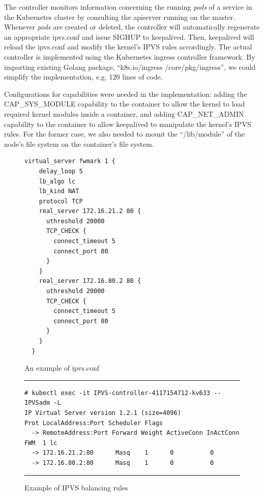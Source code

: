The controller monitors information concerning the running {\em pods} of a service 
in the Kubernetes cluster by consulting the apiserver running on the master.
Whenever {\em pods} are created or deleted, the controller will automatically regenerate an appropriate ipvs.conf 
and issue SIGHUP to keepalived.
Then, keepalived will reload the ipvs.conf and modify the kernel's IPVS rules accordingly.
The actual controller\cite{ktaka_ccmp_2017_826894} is implemented using the Kubernetes ingress controller\cite{K8sIngress2017} framework. 
By importing existing Golang package, \enquote{k8s.io/ingress /core/pkg/ingress}, we could simplify the implementation, e.g. 
120 lines of code.  


Configurations for capabilities were needed in the implementation: adding the CAP\_SYS\_MODULE capability 
to the container to allow the kernel to load required kernel modules inside a container, 
and adding CAP\_NET\_ADMIN capability to the container to allow keepalived to manipulate the kernel's IPVS rules. 
For the former case, we also needed to mount the \enquote{/lib/module} of the node's file system on the container's file system.

\begin{figure}
  \centering
\begin{minipage}{0.7\columnwidth}
\begin{lstlisting}[frame=single]
  virtual_server fwmark 1 {
    delay_loop 5
    lb_algo lc
    lb_kind NAT
    protocol TCP
    real_server 172.16.21.2 80 {
      uthreshold 20000
      TCP_CHECK {
        connect_timeout 5
        connect_port 80
      }
    }
    real_server 172.16.80.2 80 {
      uthreshold 20000
      TCP_CHECK {
        connect_timeout 5
        connect_port 80
      }
    }
  }
\end{lstlisting}
\end{minipage}
\caption{An example of ipvs.conf}
\label{fig:ipvs.conf}
\end{figure}

\begin{figure}
  \centering
\rule{\columnwidth}{0.4pt}
\begin{verbatim}
# kubectl exec -it IPVS-controller-4117154712-kv633 -- IPVSadm -L
IP Virtual Server version 1.2.1 (size=4096)
Prot LocalAddress:Port Scheduler Flags
  -> RemoteAddress:Port Forward Weight ActiveConn InActConn
FWM  1 lc
  -> 172.16.21.2:80      Masq    1      0          0         
  -> 172.16.80.2:80      Masq    1      0          0
\end{verbatim}
\rule{\columnwidth}{0.4pt}
\caption{Example of IPVS balancing rules}
\label{fig:IPVS rule}
\end{figure}


